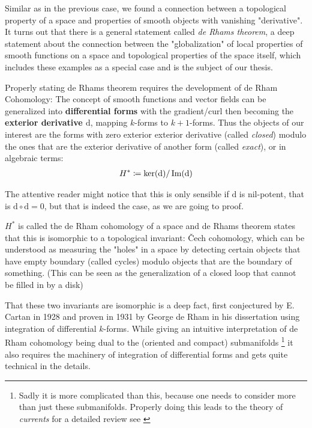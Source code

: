 Similar as in the previous case, we found a connection between a topological property of a space and properties of smooth
objects with vanishing "derivative". It turns out that there is a general statement called \textit{de Rhams theorem}, a deep
statement about the connection between the "globalization" of local properties of smooth functions on a space and topological
properties of the space itself, which includes these examples as a special case and is the subject of our thesis.

Properly stating de Rhams theorem requires the development of de Rham Cohomology: The concept of smooth
functions and vector fields can be generalized into \textbf{differential forms} with the gradient/curl then
becoming the \textbf{exterior derivative $\mathrm{d}$}, mapping $k$-forms to $k+1$-forms. Thus the objects
of our interest are the forms with zero exterior exterior derivative (called \textit{closed}) modulo the ones that are
the exterior derivative of another form (called \textit{exact}), or in algebraic terms:
\begin{align*}
	H^* \coloneqq \ker(\mathrm{d}) / \operatorname{Im}(\mathrm{d})
\end{align*}

\begin{remark}
The attentive reader might notice that this is only sensible if $\mathrm{d}$ is nil-potent, that
is $\mathrm{d} \circ \mathrm{d} = 0$, but that is indeed the case, as we are going to proof.
\end{remark}

$H^*$ is called the de Rham cohomology of a space and de Rhams theorem states that this is
isomorphic to a topological invariant: Čech cohomology, which can be understood as measuring the "holes"
in a space by detecting certain objects that have empty boundary (called cycles) modulo objects that are the
boundary of something. (This can be seen as the generalization of a closed loop that cannot be filled in by a disk)

That these two invariants are isomorphic is a deep fact, first conjectured by E. Cartan in 1928 and
proven in 1931 by George de Rham in his dissertation \cite{de_rham_sur_1931} using integration
of differential $k$-forms. While giving an intuitive interpretation of de Rham cohomology being dual to the
(oriented and compact) submanifolds
\footnote{
	Sadly it is more complicated than this, because one needs to consider more than just these submanifolds.
	Properly doing this leads to the theory of \textit{currents} for a detailed review see \cite{de_rham_differentiable_1984}
}
it also requires the machinery of integration of differential forms and gets quite technical in the details.

